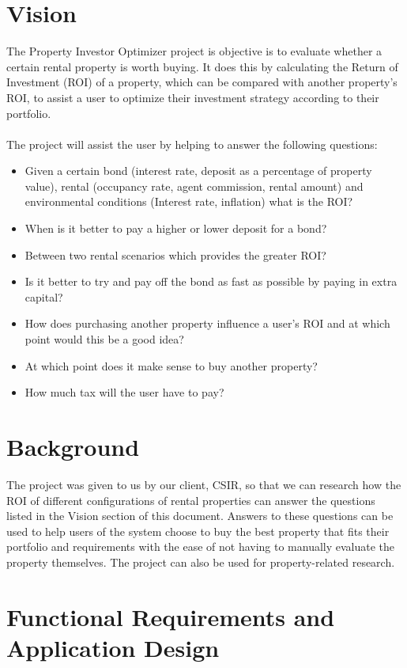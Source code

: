 \documentclass[a4paper,12pt]{article}
\begin{document}
\section{Vision}
The Property Investor Optimizer project is objective is to evaluate whether a certain rental property is worth buying. It does this by calculating the Return of Investment (ROI) of a property, which can be compared with another property's ROI, to assist a user to optimize their investment strategy according to their portfolio.\\\\
The project will assist the user by helping to answer the following questions:\begin{itemize}
	\item Given a certain bond (interest rate, deposit as a percentage of property value), rental (occupancy rate, agent commission, rental amount) and environmental conditions (Interest rate, inflation) what is the ROI?
	\item When is it better to pay a higher or lower deposit for a bond?
	\item Between two rental scenarios which provides the greater ROI?
	\item Is it better to try and pay off the bond as fast as possible by paying in extra capital?
	\item How does purchasing another property influence a user's ROI and at which point would this be a good idea?
	\item At which point does it make sense to buy another property?
	\item How much tax will the user have to pay?

\end{itemize}
\newpage
\section{Background}
The project was given to us by our client, CSIR, so that we can research how the ROI of different configurations of rental properties can answer the questions listed in the Vision section of this document. Answers to these questions can be used to help users of the system choose to buy the best property that fits their portfolio and requirements with the ease of not having to manually evaluate the property themselves. The project can also be used for property-related research.


\newpage
\section{Functional Requirements and Application Design}
\end{document}
